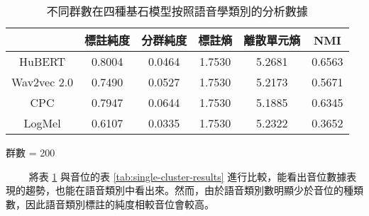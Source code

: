 \begin{table}[!htbp]
    \begin{subtable}[t]{\textwidth}
        \centering
        \begin{tabular}{|c|c|c|c|c|c|} \hline
                        & 標註純度   & 分群純度   & 標註熵    & 離散單元熵  & NMI    \\ \hline
            HuBERT      & 0.8004 & 0.0464 & 1.7530 & 5.2681 & 0.6563 \\ \hline    %
            Wav2vec 2.0 & 0.7490 & 0.0527 & 1.7530 & 5.2173 & 0.5671 \\ \hline    %
            CPC         & 0.7947 & 0.0644 & 1.7530 & 5.1885 & 0.6345 \\ \hline    %
            LogMel      & 0.6107 & 0.0335 & 1.7530 & 5.2322 & 0.3652 \\ \hline    %
        \end{tabular}
        \caption{群數 = 200}
        \label{tab:ch3-clu200-pcls}
    \end{subtable}

    \caption{不同群數在四種基石模型按照語音學類別的分析數據}
    \label{tab:single-cluster-phonetype-results}
\end{table}
　　
將表 \ref{tab:single-cluster-phonetype-results} 與音位的表 \ref{tab:single-cluster-results} 進行比較，能看出音位數據表現的趨勢，也能在語音類別中看出來。然而，由於語音類別數明顯少於音位的種類數，因此語音類別標註的純度相較音位會較高。

